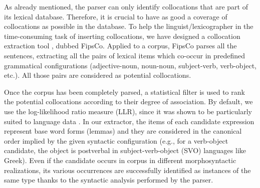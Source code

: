 \documentclass[output=paper]{langsci/langscibook}
\begin{document}
As already mentioned, the parser can only identify collocations that are part of its lexical database. Therefore, it is crucial to have as good a coverage of collocations as possible in the database. To help the linguist/lexicographer in the time-consuming task of inserting collocations, we have designed a collocation  extraction tool \citep{seretan11}, dubbed FipsCo. Applied to a corpus, FipsCo parses all the sentences, extracting all the pairs of lexical items which co-occur in predefined grammatical configurations (adjective-noun, noun-noun, subject-verb, verb-object, etc.). All those pairs are considered as potential collocations.

Once the corpus has been completely parsed, a statistical filter  is used to rank the potential collocations according to their degree of association. By default, we use the log-likelihood ratio measure (LLR), since it was shown to be particularly suited to language data \citep{dunning93}. In our extractor, the items of each candidate expression represent base word forms (lemmas) and they are considered in the canonical order implied by the given syntactic configuration (e.g., for a verb-object candidate, the object is postverbal in subject-verb-object (SVO) languages like Greek). Even if the candidate occurs in corpus in different morphosyntactic realizations, its various occurrences are successfully identified as instances of the same type thanks to the syntactic analysis performed by the parser. 
\end{document}
